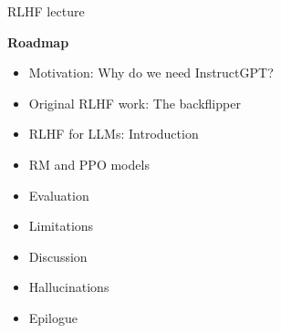 \begin{vbframe}{RLHF lecture}

\vfill

\textbf{Roadmap}

	\begin{itemize}
		\item Motivation: Why do we need InstructGPT?
		\item Original RLHF work: The backflipper
                \item RLHF for LLMs: Introduction 
                  \item RM and PPO models
                  \item Evaluation
                    \item Limitations
\item Discussion
\item Hallucinations
\item Epilogue
	\end{itemize}

\vfill

\end{vbframe}
